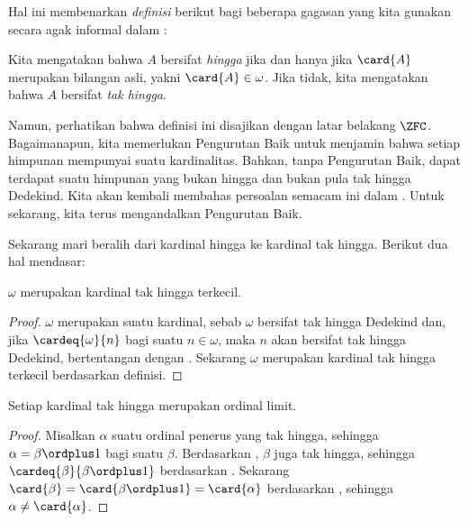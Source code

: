\documentclass[../../../include/open-logic-section]{subfiles}
\begin{document}
Hal ini membenarkan \emph{definisi} berikut bagi beberapa gagasan yang kita
gunakan secara agak informal dalam :

\begin{defn}
Kita mengatakan bahwa $A$ bersifat \emph{hingga} jika dan hanya jika
$\card{A}$ merupakan bilangan asli, yakni $\card{A} \in \omega$. Jika tidak,
kita mengatakan bahwa $A$ bersifat \emph{tak hingga}.
\end{defn}
\noindent
Namun, perhatikan bahwa definisi ini disajikan dengan latar belakang
$\ZFC$. Bagaimanapun, kita memerlukan Pengurutan Baik untuk menjamin bahwa
setiap himpunan mempunyai suatu kardinalitas. Bahkan, tanpa Pengurutan Baik,
dapat terdapat suatu himpunan yang bukan hingga dan bukan pula tak hingga
Dedekind. Kita akan kembali membahas persoalan semacam ini dalam
. Untuk sekarang, kita terus mengandalkan Pengurutan
Baik.

Sekarang mari beralih dari kardinal hingga ke kardinal tak hingga. Berikut
dua hal mendasar:

\begin{cor}
$\omega$ merupakan kardinal tak hingga terkecil.
\end{cor}

\begin{proof}
$\omega$ merupakan suatu kardinal, sebab $\omega$ bersifat tak hingga
Dedekind dan, jika $\cardeq{\omega}{n}$ bagi suatu $n \in \omega$, maka $n$
akan bersifat tak hingga Dedekind, bertentangan dengan
. Sekarang $\omega$
merupakan kardinal tak hingga terkecil berdasarkan definisi.
\end{proof}

\begin{cor}
Setiap kardinal tak hingga merupakan ordinal limit.
\end{cor}

\begin{proof}
Misalkan $\alpha$ suatu ordinal penerus yang tak hingga, sehingga
$\alpha = \beta \ordplus 1$ bagi suatu $\beta$. Berdasarkan
, $\beta$ juga tak hingga, sehingga
$\cardeq{\beta}{\beta \ordplus 1}$ berdasarkan
. Sekarang
$\card{\beta} = \card{\beta\ordplus 1} = \card{\alpha}$ berdasarkan
, sehingga
$\alpha \neq \card{\alpha}$.
\end{proof}
\end{document}
